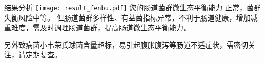 \vspace*{0mm}

\begin{spacing}{1.5}

\begin{LRaside}[.8]{\fontsize{8.8pt}{11pt}\selectfont 结果分析}
\noindent
\texttt{[image: result\_fenbu.pdf]}
\asidebreak %
\fontsize{8pt}{11pt}\selectfont
您的肠道菌群微生态平衡能力
正常，菌群失衡风险中等。
但肠道菌群多样性、有益菌指标异常，不利于肠道健康，增加减重难度，需及时调理肠道菌群，提高肠道微生态平衡能力。


\noindent 另外致病菌小韦荣氏球菌含量超标，易引起腹胀腹泻等肠道不适症状，需密切关注，请定期复查。

\end{LRaside}

\end{spacing}



